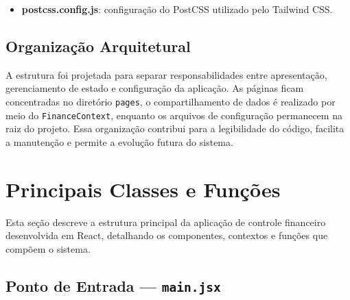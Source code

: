 \documentclass{article}
\begin{document}
\begin{itemize}
\begin{itemize}
        \item \textbf{App.jsx}: componente principal da aplicação responsável pela renderização da interface.
        
        \item \textbf{App.css}: arquivo de estilos específicos do componente principal.
        
        \item \textbf{index.css}: arquivo global de estilização da aplicação.
        
        \item \textbf{main.jsx}: ponto de entrada da aplicação React, responsável por inicializar a renderização dos componentes.
    \end{itemize}

    \item \textbf{postcss.config.js}: configuração do PostCSS utilizado pelo Tailwind CSS.

\end{itemize}

\subsection{Organização Arquitetural}

A estrutura foi projetada para separar responsabilidades entre apresentação, gerenciamento de estado e configuração da aplicação. As páginas ficam concentradas no diretório \texttt{pages}, o compartilhamento de dados é realizado por meio do \texttt{FinanceContext}, enquanto os arquivos de configuração permanecem na raiz do projeto. Essa organização contribui para a legibilidade do código, facilita a manutenção e permite a evolução futura do sistema.


\section{Principais Classes e Funções}


Esta seção descreve a estrutura principal da aplicação de controle financeiro desenvolvida em React, detalhando os componentes, contextos e funções que compõem o sistema.

\subsection{Ponto de Entrada — \texttt{main.jsx}}
\end{document}
